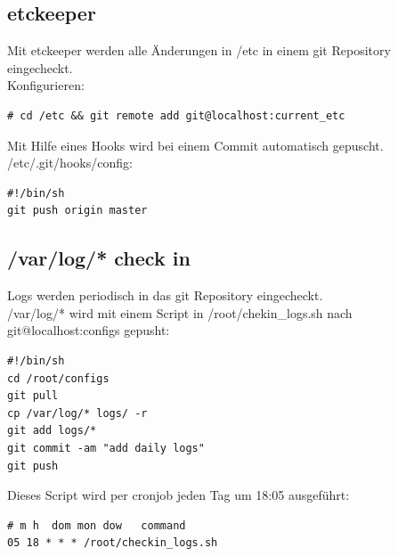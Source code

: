 \subsection{etckeeper}
Mit etckeeper werden alle Änderungen in /etc in einem git Repository eingecheckt.\\
Konfigurieren:
\begin{lstlisting}[style=Bash]
# cd /etc && git remote add git@localhost:current_etc
\end{lstlisting}
Mit Hilfe eines Hooks wird bei einem Commit automatisch gepuscht.\\
/etc/.git/hooks/config:
\begin{lstlisting}[style=Bash]
#!/bin/sh
git push origin master
\end{lstlisting}
\subsection{/var/log/* check in}
Logs werden periodisch in das git Repository eingecheckt.\\
/var/log/* wird mit einem Script in /root/chekin\_logs.sh nach git@localhost:configs gepusht:
\begin{lstlisting}[style=Bash]
#!/bin/sh
cd /root/configs
git pull
cp /var/log/* logs/ -r
git add logs/*
git commit -am "add daily logs"
git push
\end{lstlisting}
Dieses Script wird per cronjob jeden Tag um 18:05 ausgeführt:
\begin{lstlisting}[style=Bash]
# m h  dom mon dow   command
05 18 * * * /root/checkin_logs.sh
\end{lstlisting}
